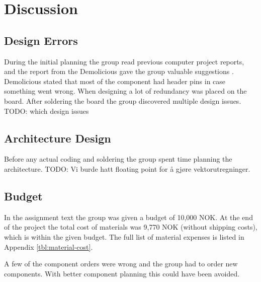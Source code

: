 \chapter{Discussion}

\section{Design Errors}
During the initial planning the group read previous computer project reports,
and the report from the Demolicious gave the group valuable suggestions \cite{demolicious-report}.
Demolicious stated that most of the component had header pins in case something went wrong.
When designing a lot of redundancy was placed on the board.
After soldering the board the group discovered multiple design issues. TODO: which design issues

\section{Architecture Design}
Before any actual coding and soldering the group spent time planning the architecture.
TODO: Vi burde hatt floating point for å gjøre vektorutregninger.

\section{Budget}
In the assignment text the group was given a budget of 10,000 NOK.
At the end of the project the total cost of materials was 9,770 NOK (without shipping costs), which is within the given budget.
The full list of material expenses is listed in Appendix \ref{tbl:material-cost}.

A few of the component orders were wrong and the group had to order new components.
With better component planning this could have been avoided.
